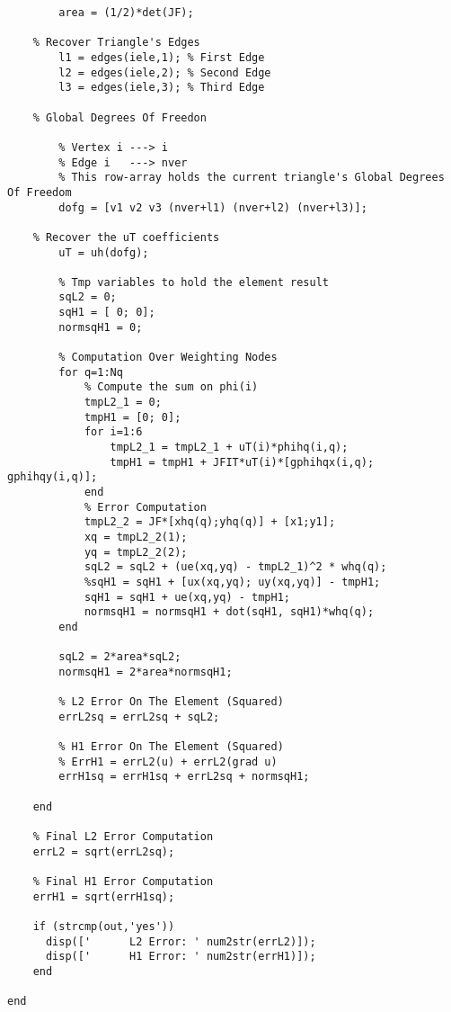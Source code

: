 \documentclass[12pt,a4paper]{report}
\theoremstyle{theorem}
\theoremstyle{theorem}
\theoremstyle{definition}
\begin{document}
\begin{lstlisting}[caption=Errore $L^2$ e $\mathbb{H}^1$, style=matlab]
        % Single Element Area (Triangle's Area)
        area = (1/2)*det(JF);
    
    % Recover Triangle's Edges
        l1 = edges(iele,1); % First Edge
        l2 = edges(iele,2); % Second Edge
        l3 = edges(iele,3); % Third Edge

    % Global Degrees Of Freedon

        % Vertex i ---> i
        % Edge i   ---> nver
        % This row-array holds the current triangle's Global Degrees Of Freedom
        dofg = [v1 v2 v3 (nver+l1) (nver+l2) (nver+l3)];
    
    % Recover the uT coefficients
        uT = uh(dofg);
        
        % Tmp variables to hold the element result
        sqL2 = 0;
        sqH1 = [ 0; 0];
        normsqH1 = 0;
        
        % Computation Over Weighting Nodes
        for q=1:Nq
            % Compute the sum on phi(i)
            tmpL2_1 = 0; 
            tmpH1 = [0; 0];       
            for i=1:6
                tmpL2_1 = tmpL2_1 + uT(i)*phihq(i,q);
                tmpH1 = tmpH1 + JFIT*uT(i)*[gphihqx(i,q); gphihqy(i,q)];
            end
            % Error Computation
            tmpL2_2 = JF*[xhq(q);yhq(q)] + [x1;y1];
            xq = tmpL2_2(1);
            yq = tmpL2_2(2);            
            sqL2 = sqL2 + (ue(xq,yq) - tmpL2_1)^2 * whq(q);
            %sqH1 = sqH1 + [ux(xq,yq); uy(xq,yq)] - tmpH1;
            sqH1 = sqH1 + ue(xq,yq) - tmpH1;
            normsqH1 = normsqH1 + dot(sqH1, sqH1)*whq(q);
        end
    
        sqL2 = 2*area*sqL2;
        normsqH1 = 2*area*normsqH1;
        
        % L2 Error On The Element (Squared)
        errL2sq = errL2sq + sqL2;
        
        % H1 Error On The Element (Squared)
        % ErrH1 = errL2(u) + errL2(grad u)
        errH1sq = errH1sq + errL2sq + normsqH1;
        
    end  
    
    % Final L2 Error Computation
    errL2 = sqrt(errL2sq);
    
    % Final H1 Error Computation
    errH1 = sqrt(errH1sq);
    
    if (strcmp(out,'yes'))
      disp(['      L2 Error: ' num2str(errL2)]);
      disp(['      H1 Error: ' num2str(errH1)]);
    end
    
end
\end{lstlisting}
\end{document}
